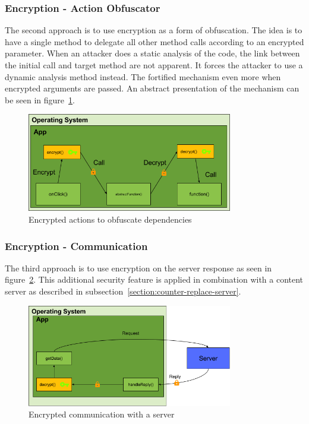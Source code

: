 \subsubsection{Encryption - Action Obfuscator} \label{subsubsectionection:counter-replace-encryption-content-obfuscator}
The second approach is to use encryption as a form of obfuscation.
The idea is to have a single method to delegate all other method calls according to an encrypted parameter.
\newline
When an attacker does a static analysis of the code, the link between the initial call and target method are not apparent.
It forces the attacker to use a dynamic analysis method instead.
The fortified mechanism even more when encrypted arguments are passed.
\newline
An abstract presentation of the mechanism can be seen in figure~\ref{fig:encryptionAction}.
\begin{figure}[h]
    \centering
    \includegraphics[width=0.8\textwidth]{data/encryptionAction.png}
    \caption{Encrypted actions to obfuscate dependencies}
    \label{fig:encryptionAction}
\end{figure}

\subsubsection{Encryption - Communication} \label{section:counter-replace-encryption-content-communication}
The third approach is to use encryption on the server response as seen in figure~\ref{fig:encryptionComm}.
This additional security feature is applied in combination with a content server as described in subsection~\ref{section:counter-replace-server}.
\newline
\begin{figure}[h]
    \centering
    \includegraphics[width=0.8\textwidth]{data/encryptionComm.png}
    \caption{Encrypted communication with a server}
    \label{fig:encryptionComm}
\end{figure}
